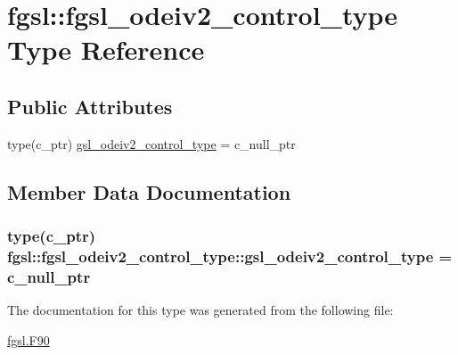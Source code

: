 \hypertarget{structfgsl_1_1fgsl__odeiv2__control__type}{}\section{fgsl\+:\+:fgsl\+\_\+odeiv2\+\_\+control\+\_\+type Type Reference}
\label{structfgsl_1_1fgsl__odeiv2__control__type}
\subsection*{Public Attributes}
\begin{DoxyCompactItemize}
\item 
type(c\+\_\+ptr) \hyperlink{structfgsl_1_1fgsl__odeiv2__control__type_a4adaf9a7e91a79cc2104841b9e0710b5}{gsl\+\_\+odeiv2\+\_\+control\+\_\+type} = c\+\_\+null\+\_\+ptr
\end{DoxyCompactItemize}


\subsection{Member Data Documentation}
\hypertarget{structfgsl_1_1fgsl__odeiv2__control__type_a4adaf9a7e91a79cc2104841b9e0710b5}{}
\subsubsection[{gsl\+\_\+odeiv2\+\_\+control\+\_\+type}]{\setlength{\rightskip}{0pt plus 5cm}type(c\+\_\+ptr) fgsl\+::fgsl\+\_\+odeiv2\+\_\+control\+\_\+type\+::gsl\+\_\+odeiv2\+\_\+control\+\_\+type = c\+\_\+null\+\_\+ptr}\label{structfgsl_1_1fgsl__odeiv2__control__type_a4adaf9a7e91a79cc2104841b9e0710b5}


The documentation for this type was generated from the following file\+:\begin{DoxyCompactItemize}
\item 
\hyperlink{fgsl_8F90}{fgsl.\+F90}\end{DoxyCompactItemize}
